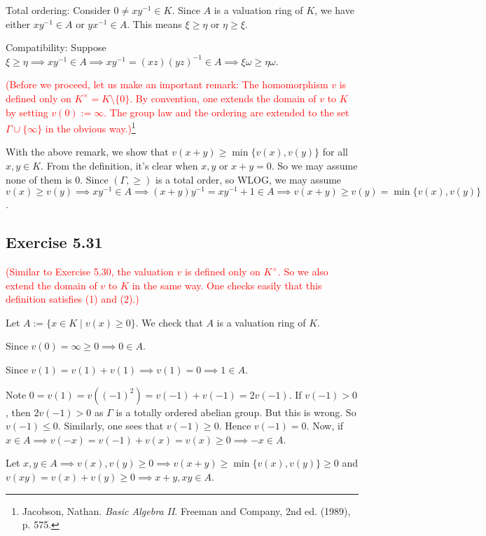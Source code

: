 \documentclass[../A&M.tex]{subfiles}
\begin{document}
Total ordering: Consider $0 \neq xy^{-1} \in K$. Since $A$ is a valuation ring of $K$, we have either $xy^{-1} \in A$ or $yx^{-1} \in A$. This means $\xi \geq \eta$ or $\eta \geq \xi$.

Compatibility: Suppose $\xi \geq \eta \implies xy^{-1} \in A \implies xy^{-1} = (xz)(yz)^{-1} \in A \implies \xi\omega \geq \eta\omega$.

\textcolor{red}{(Before we proceed, let us make an important remark: The homomorphism $v$ is defined only on $K^\times = K \setminus \{0\}$. By convention, one extends the domain of $v$ to $K$ by setting $v(0):=\infty$. The group law and the ordering are extended to the set $\Gamma \cup \{\infty\}$ in the obvious way.)}\footnote{Jacobson, Nathan. \textit{Basic Algebra II}. Freeman and Company, 2nd ed. (1989), p. 575.}

With the above remark, we show that $v(x+y) \geq \min \{v(x),v(y)\}$ for all $x,y\in K$. From the definition, it's clear when $x,y$ or $x+y=0$. So we may assume none of them is $0$. Since $(\Gamma,\geq)$ is a total order, so WLOG, we may assume $v(x) \geq v(y) \implies xy^{-1} \in A \implies (x+y)y^{-1} = xy^{-1} + 1 \in A \implies v(x+y) \geq v(y) = \min \{v(x),v(y)\}$.

\subsection*{Exercise 5.31}

\textcolor{red}{(Similar to Exercise 5.30, the valuation $v$ is defined only on $K^\times$. So we also extend the domain of $v$ to $K$ in the same way. One checks easily that this definition satisfies (1) and (2).)}

Let $A:= \{x \in K \mid v(x) \geq 0 \}$. We check that $A$ is a valuation ring of $K$.

Since $v(0) = \infty \geq 0 \implies 0 \in A$.

Since $v(1) = v(1) + v(1) \implies v(1)=0 \implies 1 \in A$. 

Note $0 = v(1) = v((-1)^2) = v(-1) + v(-1) = 2v(-1)$. If $v(-1) > 0$, then $2v(-1) > 0$ as $\Gamma$ is a totally ordered abelian group. But this is wrong. So $v(-1) \leq 0$. Similarly, one sees that $v(-1) \geq 0$. Hence $v(-1) = 0$. Now, if $x \in A \implies v(-x) = v(-1) + v(x) = v(x) \geq 0 \implies -x \in A$.

Let $x,y \in A \implies v(x),v(y) \geq 0 \implies v(x+y) \geq \min \{v(x),v(y)\} \geq 0$ and $v(xy) = v(x) + v(y) \geq 0 \implies x+y,xy \in A$.
\end{document}
